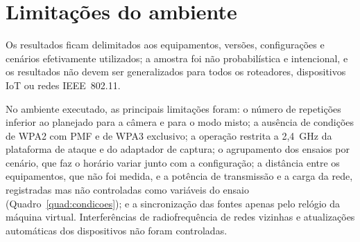 \section{Limitações do ambiente}
\label{sec:limitacoes_ambiente}

Os resultados ficam delimitados aos equipamentos, versões, configurações e cenários efetivamente utilizados; a amostra foi não probabilística e intencional, e os resultados não devem ser generalizados para todos os roteadores, dispositivos IoT ou redes IEEE~802.11.

No ambiente executado, as principais limitações foram: o número de repetições inferior ao planejado para a câmera e para o modo misto; a ausência de condições de WPA2 com PMF e de WPA3 exclusivo; a operação restrita a 2,4~GHz da plataforma de ataque e do adaptador de captura; o agrupamento dos ensaios por cenário, que faz o horário variar junto com a configuração; a distância entre os equipamentos, que não foi medida, e a potência de transmissão e a carga da rede, registradas mas não controladas como variáveis do ensaio (Quadro~\ref{quad:condicoes}); e a sincronização das fontes apenas pelo relógio da máquina virtual. Interferências de radiofrequência de redes vizinhas e atualizações automáticas dos dispositivos não foram controladas.
